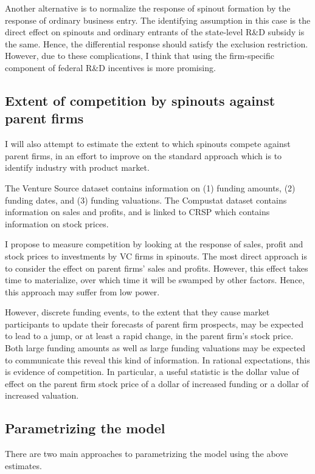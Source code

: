 \documentclass[11pt,english]{article}
\theoremstyle{remark}
\begin{document}
Another alternative is to normalize the response of spinout formation by the response of ordinary business entry. The identifying assumption in this case is the direct effect on spinouts and ordinary entrants of the state-level R\&D subsidy is the same. Hence, the differential response should satisfy the exclusion restriction. However, due to these complications, I think that using the firm-specific component of federal R\&D incentives is more promising.

\subsection{Extent of competition by spinouts against parent firms}

I will also attempt to estimate the extent to which spinouts compete against parent firms, in an effort to improve on the standard approach which is to identify industry with product market. 

The Venture Source dataset contains information on (1) funding amounts, (2) funding dates, and (3) funding valuations. The Compustat dataset contains information on sales and profits, and is linked to CRSP which contains information on stock prices. 

I propose to measure competition by looking at the response of sales, profit and stock prices to investments by VC firms in spinouts. The most direct approach is to consider the effect on parent firms' sales and profits. However, this effect takes time to materialize, over which time it will be swamped by other factors. Hence, this approach may suffer from low power.

However, discrete funding events, to the extent that they cause market participants to update their forecasts of parent firm prospects, may be expected to lead to a jump, or at least a rapid change, in the parent firm's stock price. Both large funding amounts as well as large funding valuations may be expected to communicate this reveal this kind of information. In rational expectations, this is evidence of competition. In particular, a useful statistic is the dollar value of effect on the parent firm stock price of a dollar of increased funding or a dollar of increased valuation. 

\subsection{Parametrizing the model}

There are two main approaches to parametrizing the model using the above estimates. 
\end{document}

